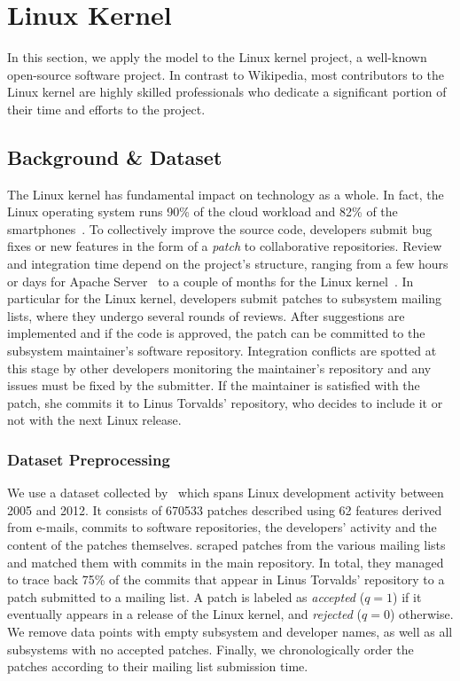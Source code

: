 \section{Linux Kernel}
\label{pps:sec:linux}

In this section, we apply the \interank{} model to the Linux kernel project, a well-known open-source software project.
In contrast to Wikipedia, most contributors to the Linux kernel are highly skilled professionals who dedicate a significant portion of their time and efforts to the project.

\subsection{Background \& Dataset}

The Linux kernel has fundamental impact on technology as a whole.
In fact, the Linux operating system runs 90\% of the cloud workload and 82\% of the smartphones~\citep{corbet2017linux}.
To collectively improve the source code, developers submit bug fixes or new features in the form of a \emph{patch} to collaborative repositories.
Review and integration time depend on the project's structure, ranging from a few hours or days for Apache Server~\citep{rigby2008open} to a couple of months for the Linux kernel~\citep{jiang2013will}.
In particular for the Linux kernel, developers submit patches to subsystem mailing lists, where they undergo several rounds of reviews.
After suggestions are implemented and if the code is approved, the patch can be committed to the subsystem maintainer's software repository.
Integration conflicts are spotted at this stage by other developers monitoring the maintainer's repository and any issues must be fixed by the submitter.
If the maintainer is satisfied with the patch, she commits it to Linus Torvalds' repository, who decides to include it or not with the next Linux release.

\subsubsection{Dataset Preprocessing}

We use a dataset collected by~\citet{jiang2013will} which spans Linux development activity between 2005 and 2012.
It consists of \num{670533} patches described using \num{62} features derived from e-mails, commits to software repositories, the developers' activity and the content of the patches themselves.
\citeauthor{jiang2013will} scraped patches from the various mailing lists and matched them with commits in the main repository.
In total, they managed to trace back 75\% of the commits that appear in Linus Torvalds' repository to a patch submitted to a mailing list.
A patch is labeled as \emph{accepted} ($q = 1$) if it eventually appears in a release of the Linux kernel, and \emph{rejected} ($q = 0$) otherwise.
We remove data points with empty subsystem and developer names, as well as all subsystems with no accepted patches.
Finally, we chronologically order the patches according to their mailing list submission time.

